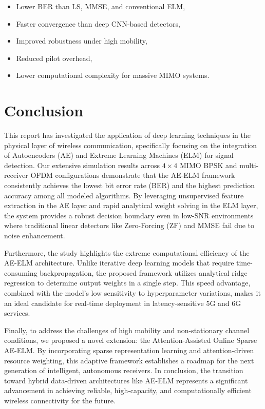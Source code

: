\documentclass[10pt, conference]{IEEEtran}
\begin{document}
\begin{itemize}
    \item Lower BER than LS, MMSE, and conventional ELM,
    \item Faster convergence than deep CNN-based detectors,
    \item Improved robustness under high mobility,
    \item Reduced pilot overhead,
    \item Lower computational complexity for massive MIMO systems.
\end{itemize}

\section{Conclusion}
This report has investigated the application of deep learning techniques in the physical layer of wireless communication, specifically focusing on the integration of Autoencoders (AE) and Extreme Learning Machines (ELM) for signal detection. Our extensive simulation results across $4 \times 4$ MIMO BPSK and multi-receiver OFDM configurations demonstrate that the AE-ELM framework consistently achieves the lowest bit error rate (BER) and the highest prediction accuracy among all modeled algorithms. By leveraging unsupervised feature extraction in the AE layer and rapid analytical weight solving in the ELM layer, the system provides a robust decision boundary even in low-SNR environments where traditional linear detectors like Zero-Forcing (ZF) and MMSE fail due to noise enhancement.

Furthermore, the study highlights the extreme computational efficiency of the AE-ELM architecture. Unlike iterative deep learning models that require time-consuming backpropagation, the proposed framework utilizes analytical ridge regression to determine output weights in a single step. This speed advantage, combined with the model's low sensitivity to hyperparameter variations, makes it an ideal candidate for real-time deployment in latency-sensitive 5G and 6G services.

Finally, to address the challenges of high mobility and non-stationary channel conditions, we proposed a novel extension: the Attention-Assisted Online Sparse AE-ELM. By incorporating sparse representation learning and attention-driven resource weighting, this adaptive framework establishes a roadmap for the next generation of intelligent, autonomous receivers. In conclusion, the transition toward hybrid data-driven architectures like AE-ELM represents a significant advancement in achieving reliable, high-capacity, and computationally efficient wireless connectivity for the future.
\end{document}

